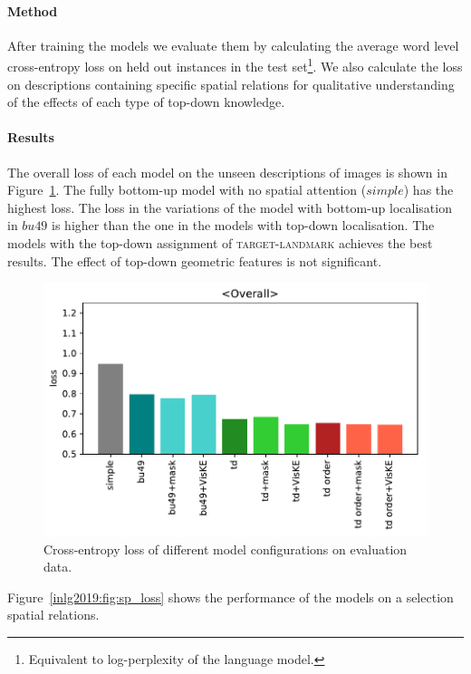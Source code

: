 \paragraph{Method}
After training the models we evaluate them by calculating the average word level
cross-entropy loss on %
held out instances in the
test set\footnote{Equivalent to log-perplexity of the language model.}. %
We also calculate the loss on descriptions containing specific
spatial relations %
for qualitative understanding of %
the effects of each type of top-down knowledge.

\paragraph{Results}
The overall loss of each model on
the %
unseen descriptions of images is shown in Figure~\ref{inlg2019:fig:loss}.  The
fully bottom-up model with no spatial attention ($simple$) has the
highest
loss. %
The loss in the variations of the model with bottom-up localisation in
$bu49$ is higher than the one in the models with top-down
localisation. %
The models with the top-down assignment of
\textsc{target}-\textsc{landmark} achieves the best
results. %
The effect of top-down geometric features is not significant.


\begin{figure}[ht!]
	\centering
	\includegraphics[width=0.6\columnwidth]{studies/inlg2019/figures/results/loss/all.pdf}%
	\caption{Cross-entropy loss of different model configurations on evaluation data.}
	\label{inlg2019:fig:loss}
\end{figure}


Figure~\ref{inlg2019:fig:sp_loss} shows the performance of the models on a selection
spatial relations.


